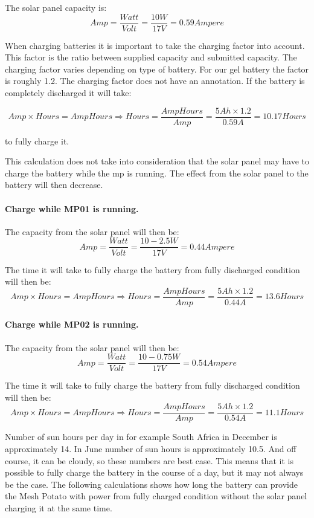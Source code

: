The solar panel capacity is:
$$Amp = \frac{Watt}{Volt} = \frac{10 W}{17 V} = 0.59 Ampere$$

When charging batteries it is important to take the charging factor into account. This factor is the ratio between supplied capacity and submitted capacity. The charging factor varies depending on type of battery. For our gel battery the factor is roughly 1.2. The charging factor does not have an annotation. 
If the battery is completely discharged it will take: 

$$Amp\times Hours = AmpHours \Rightarrow Hours =\frac{AmpHours}{Amp} = \frac{5 Ah\times 1.2}{0.59 A} = 10.17 Hours$$

to fully charge it. 

This calculation does not take into consideration that the solar panel may have to charge the battery while the \gls{mp} is running. The effect from the solar panel to the battery will then decrease. 

\paragraph{Charge while MP01 is running.}
The capacity from the solar panel will then be: 
$$Amp = \frac{Watt}{Volt} = \frac{10-2.5 W}{17 V} = 0.44 Ampere$$

The time it will take to fully charge the battery from fully discharged condition will then be: 
$$Amp\times Hours = AmpHours \Rightarrow Hours =\frac{AmpHours}{Amp} = \frac{5 Ah\times 1.2}{0.44A} = 13.6 Hours$$

\paragraph{Charge while MP02 is running.}
The capacity from the solar panel will then be: 
$$Amp = \frac{Watt}{Volt} = \frac{10-0.75 W}{17 V} = 0.54 Ampere$$

The time it will take to fully charge the battery from fully discharged condition will then be: 
$$Amp\times Hours = AmpHours \Rightarrow Hours =\frac{AmpHours}{Amp} = \frac{5 Ah\times 1.2}{0.54A} = 11.1 Hours$$

Number of sun hours per day in for example South Africa in December is approximately 14. In June number of sun hours is approximately 10.5. And off course, it can be cloudy, so these numbers are best case. This means that it is possible to fully charge the battery in the course of a day, but it may not always be the case. The following calculations shows how long the battery can provide the Mesh Potato with power from fully charged condition without the solar panel charging it at the same time. 

